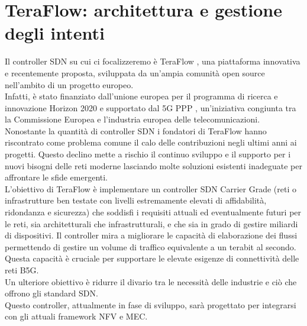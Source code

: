 \chapter{TeraFlow: architettura e gestione degli intenti}
\label{cap:teraflow}
Il controller SDN su cui ci focalizzeremo è TeraFlow \cite{TeraFlow}, una piattaforma innovativa e recentemente proposta, sviluppata da un'ampia comunità open source nell'ambito di un progetto europeo. 
\\Infatti, è stato finanziato dall'unione europea per il programma di ricerca e innovazione Horizon 2020 \cite{Horizon} e supportato dal 5G PPP \cite{5GPPP}, un'iniziativa congiunta tra la Commissione Europea e l'industria europea delle telecomunicazioni.
\\Nonostante la quantità di controller SDN i fondatori di TeraFlow hanno riscontrato come problema comune il calo delle contribuzioni negli ultimi anni ai progetti. 
Questo declino mette a rischio il continuo sviluppo e il supporto per i nuovi bisogni delle reti moderne lasciando molte soluzioni esistenti inadeguate per affrontare le sfide emergenti.
\\L'obiettivo di TeraFlow è implementare un controller SDN Carrier Grade (reti o infrastrutture ben testate con livelli estremamente elevati di affidabilità, ridondanza e sicurezza)
che soddisfi i requisiti attuali ed eventualmente futuri per le reti, sia architetturali che infrastrutturali, e che sia in grado di gestire miliardi di dispositivi.
Il controller mira a migliorare le capacità di elaborazione dei flussi permettendo di gestire un volume di traffico equivalente a un terabit al secondo. 
Questa capacità è cruciale per supportare le elevate esigenze di connettività delle reti B5G.
\\Un ulteriore obiettivo è ridurre il divario tra le necessità delle industrie e ciò che offrono gli standard SDN.
\\Questo controller, attualmente in fase di sviluppo, sarà progettato per integrarsi con gli attuali framework NFV e MEC.
